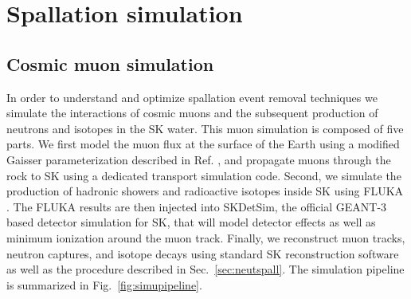 \section{Spallation simulation}
\label{sec:simulation}

\subsection{Cosmic muon simulation}
In order to understand and optimize spallation event removal techniques we simulate the interactions of cosmic muons and the subsequent production of neutrons and isotopes in the SK water. %
This muon simulation is composed of five parts. We first model the muon flux at the surface of the Earth using a modified Gaisser parameterization described in Ref. \cite{muonsimulation}, and propagate muons through the rock to SK using a dedicated transport simulation code.
Second, we simulate the production of hadronic showers and radioactive isotopes inside SK using FLUKA \cite{fluka_manual, fluka_paper}. The FLUKA results are then injected into SKDetSim, the official GEANT-3 \cite{geant3} based detector simulation for SK, that will model detector effects as well as minimum ionization around the muon track. Finally, we reconstruct muon tracks, neutron captures, and isotope decays using standard SK reconstruction software as well as the procedure described in Sec.~\ref{sec:neutspall}. The simulation pipeline is summarized in Fig.~\ref{fig:simupipeline}.
